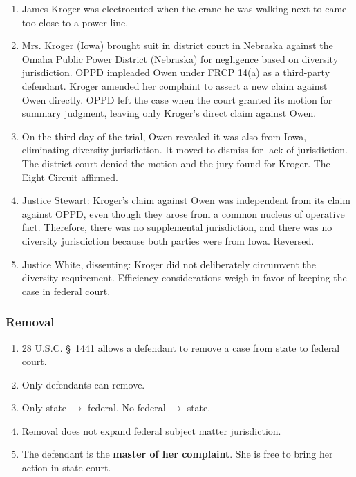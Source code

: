 \begin{enumerate}
    \item James Kroger was electrocuted when the crane he was walking next to came too close to a power line.
    \item Mrs. Kroger (Iowa) brought suit in district court in Nebraska against the Omaha Public Power District (Nebraska) for negligence based on diversity jurisdiction. OPPD impleaded Owen under FRCP 14(a) as a third-party defendant. Kroger amended her complaint to assert a new claim against Owen directly. OPPD left the case when the court granted its motion for summary judgment, leaving only Kroger's direct claim against Owen.
    \item On the third day of the trial, Owen revealed it was also from Iowa, eliminating diversity jurisdiction. It moved to dismiss for lack of jurisdiction. The district court denied the motion and the jury found for Kroger. The Eight Circuit affirmed.
    \item Justice Stewart: Kroger's claim against Owen was independent from its claim against OPPD, even though they arose from a common nucleus of operative fact. Therefore, there was no supplemental jurisdiction, and there was no diversity jurisdiction because both parties were from Iowa. Reversed.
    \item Justice White, dissenting: Kroger did not deliberately circumvent the diversity requirement. Efficiency considerations weigh in favor of keeping the case in federal court. 
\end{enumerate}

\subsubsection{Removal}

\begin{enumerate}
    \item 28 U.S.C. \S\ 1441 allows a defendant to remove a case from state to federal court.
    \item Only defendants can remove.
    \item Only state $\rightarrow$ federal. No federal $\rightarrow$ state.
    \item Removal does not expand federal subject matter jurisdiction.
    \item The defendant is the \textbf{master of her complaint}. She is free to bring her action in state court.
\end{enumerate}

